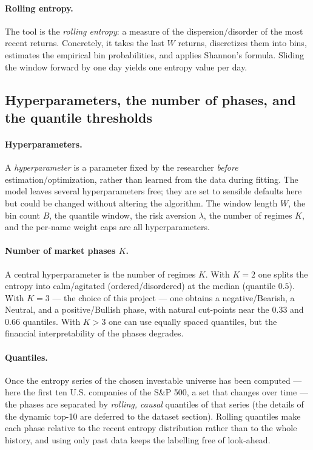 \documentclass[a4paper,12pt]{article}
\begin{document}
\paragraph{Rolling entropy.} The tool is the \emph{rolling entropy}: a measure of the dispersion/disorder of the most recent returns. Concretely, it takes the last \(W\) returns, discretizes them into bins, estimates the empirical bin probabilities, and applies Shannon's formula. Sliding the window forward by one day yields one entropy value per day.

\subsection{Hyperparameters, the number of phases, and the quantile thresholds}

\paragraph{Hyperparameters.} A \emph{hyperparameter} is a parameter fixed by the researcher \emph{before} estimation/optimization, rather than learned from the data during fitting. The model leaves several hyperparameters free; they are set to sensible defaults here but could be changed without altering the algorithm. The window length \(W\), the bin count \(B\), the quantile window, the risk aversion \(\lambda\), the number of regimes \(K\), and the per-name weight caps are all hyperparameters.

\paragraph{Number of market phases \(K\).} A central hyperparameter is the number of regimes \(K\). With \(K=2\) one splits the entropy into calm/agitated (ordered/disordered) at the median (quantile \(0.5\)). With \(K=3\) --- the choice of this project --- one obtains a negative/Bearish, a Neutral, and a positive/Bullish phase, with natural cut-points near the \(0.33\) and \(0.66\) quantiles. With \(K>3\) one can use equally spaced quantiles, but the financial interpretability of the phases degrades.

\paragraph{Quantiles.} Once the entropy series of the chosen investable universe has been computed --- here the first ten U.S. companies of the S\&P 500, a set that changes over time --- the phases are separated by \emph{rolling, causal} quantiles of that series (the details of the dynamic top-10 are deferred to the dataset section). Rolling quantiles make each phase relative to the recent entropy distribution rather than to the whole history, and using only past data keeps the labelling free of look-ahead.
\end{document}
